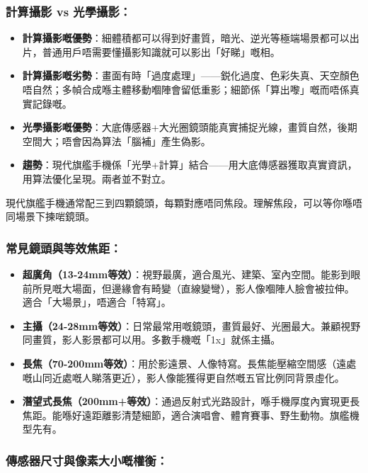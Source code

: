 \subsubsection*{計算攝影 vs 光學攝影：}

\begin{itemize}
  \item \textbf{計算攝影嘅優勢}：細體積都可以得到好畫質，暗光、逆光等極端場景都可以出片，普通用戶唔需要懂攝影知識就可以影出「好睇」嘅相。
  \item \textbf{計算攝影嘅劣勢}：畫面有時「過度處理」——鋭化過度、色彩失真、天空顏色唔自然；多幀合成喺主體移動嗰陣會留低重影；細節係「算出嚟」嘅而唔係真實記錄嘅。
  \item \textbf{光學攝影嘅優勢}：大底傳感器+大光圈鏡頭能真實捕捉光線，畫質自然，後期空間大；唔會因為算法「腦補」產生偽影。
  \item \textbf{趨勢}：現代旗艦手機係「光學+計算」結合——用大底傳感器獲取真實資訊，用算法優化呈現。兩者並不對立。
\end{itemize}


現代旗艦手機通常配三到四顆鏡頭，每顆對應唔同焦段。理解焦段，可以等你喺唔同場景下揀啱鏡頭。

\subsubsection*{常見鏡頭與等效焦距：}

\begin{itemize}
  \item \textbf{超廣角（13-24mm等效）}：視野最廣，適合風光、建築、室內空間。能影到眼前所見嘅大場面，但邊緣會有畸變（直線變彎），影人像嗰陣人臉會被拉伸。適合「大場景」，唔適合「特寫」。
  \item \textbf{主攝（24-28mm等效）}：日常最常用嘅鏡頭，畫質最好、光圈最大。兼顧視野同畫質，影人影景都可以用。多數手機嘅「1x」就係主攝。
  \item \textbf{長焦（70-200mm等效）}：用於影遠景、人像特寫。長焦能壓縮空間感（遠處嘅山同近處嘅人睇落更近），影人像能獲得更自然嘅五官比例同背景虛化。
  \item \textbf{潛望式長焦（200mm+等效）}：通過反射式光路設計，喺手機厚度內實現更長焦距。能喺好遠距離影清楚細節，適合演唱會、體育賽事、野生動物。旗艦機型先有。
\end{itemize}

\subsubsection*{傳感器尺寸與像素大小嘅權衡：}

